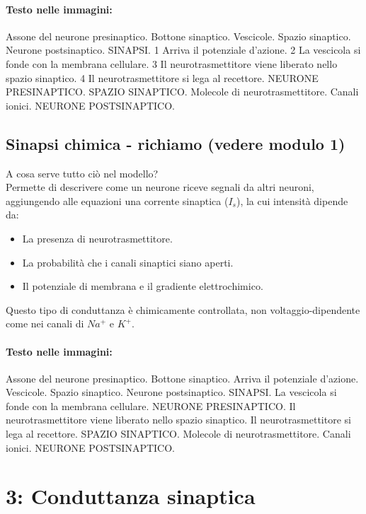 \paragraph*{Testo nelle immagini:}
Assone del neurone presinaptico. Bottone sinaptico. Vescicole. Spazio sinaptico. Neurone postsinaptico. SINAPSI. 1 Arriva il potenziale d'azione. 2 La vescicola si fonde con la membrana cellulare. 3 Il neurotrasmettitore viene liberato nello spazio sinaptico. 4 Il neurotrasmettitore si lega al recettore. NEURONE PRESINAPTICO. SPAZIO SINAPTICO. Molecole di neurotrasmettitore. Canali ionici. NEURONE POSTSINAPTICO.


\subsection{Sinapsi chimica - richiamo (vedere modulo 1)}

A cosa serve tutto ciò nel modello?\\
Permette di descrivere come un neurone riceve segnali da altri neuroni, aggiungendo alle equazioni una corrente sinaptica ($I_{s}$), la cui intensità dipende da:
\begin{itemize}
    \item La presenza di neurotrasmettitore.
    \item La probabilità che i canali sinaptici siano aperti.
    \item Il potenziale di membrana e il gradiente elettrochimico.
\end{itemize}
Questo tipo di conduttanza è chimicamente controllata, non voltaggio-dipendente come nei canali di $Na^{+}$ e $K^{+}$.

\paragraph*{Testo nelle immagini:}
Assone del neurone presinaptico. Bottone sinaptico. Arriva il potenziale d'azione. Vescicole. Spazio sinaptico. Neurone postsinaptico. SINAPSI. La vescicola si fonde con la membrana cellulare. NEURONE PRESINAPTICO. Il neurotrasmettitore viene liberato nello spazio sinaptico. Il neurotrasmettitore si lega al recettore. SPAZIO SINAPTICO. Molecole di neurotrasmettitore. Canali ionici. NEURONE POSTSINAPTICO.


\section*{ 3: Conduttanza sinaptica}

